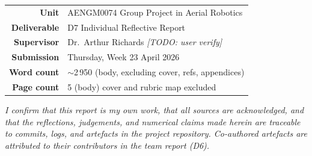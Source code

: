 \begin{titlepage}
  \vspace{1.2cm}

  \begin{tabular}{rl}
    \textbf{Unit}           & AENGM0074 Group Project in Aerial Robotics \\
    \textbf{Deliverable}    & D7 \textemdash{} Individual Reflective Report \\
    \textbf{Supervisor}     & Dr.\ Arthur Richards \textit{[TODO: user verify]} \\
    \textbf{Submission}     & Thursday, Week 23 \textemdash{} April 2026 \\
    \textbf{Word count}     & $\sim$2\,950 (body, excluding cover, refs, appendices) \\
    \textbf{Page count}     & 5 (body) \textbar{} cover and rubric map excluded \\
  \end{tabular}

  \vfill

  \begin{minipage}{0.88\textwidth}
    \footnotesize\centering
    \textit{I confirm that this report is my own work, that all sources are
    acknowledged, and that the reflections, judgements, and numerical claims
    made herein are traceable to commits, logs, and artefacts in the project
    repository. Co-authored artefacts are attributed to their contributors
    in the team report (D6).}
  \end{minipage}
  \vspace{0.4cm}

\end{titlepage}

\setcounter{page}{1}
